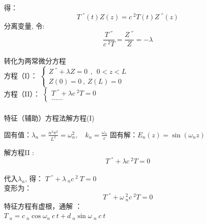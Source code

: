 \begin{frame}
      \frametitle{} 
    得：
	\begin{equation*}
		 T~^{''}(t)Z(z) =c~^2 T(t)Z~^{''}(z) 
	\end{equation*}
	分离变量, 令: {\hspace*{2em}}
      $$ \dfrac{T~^{''}}{c~^2 T}=\dfrac{Z~^{''} }{Z} =-\lambda $$ \\ \vspace{0.3cm}
    转化为两常微分方程 \\ \vspace{0.3cm}
    方程（I）：
      $\displaystyle  \begin{cases}
          Z~^{''} +\lambda Z=0  ~~,~~ 0<z<L\\
          Z(0)=0 ~,~Z(L)=0
      \end{cases}$ \\	
    方程（II）：
      $\displaystyle  \begin{cases}
          T~^{''} +\lambda {c~^2 T}=0 \\
          ......
      \end{cases}$ \\	  
\end{frame}

\begin{frame}
      \frametitle{}
    特征（辅助）方程法解方程(I)  
    \begin{enumerate}
    \IItem 固有值：$\displaystyle  \lambda_n=\frac{n^2\pi^2}{L^2}= \omega^2 _n, \quad k_n=\frac{\omega_n}{c} $ 
    \IItem 固有解：$\displaystyle  E_n(z)=\sin (\omega_n z) $
    \end{enumerate}
    解方程II : 	\[ T~^{''} +\lambda {c~^2 T}=0 \] \\ 
	代入$\lambda_n$, 得：
	$\displaystyle  T~^{''} +\lambda~_n c~^2 ~T=0 $ \\
	变形为：\[  T~^{''} +\omega ~_n ^2 {c~^2 T}=0 \]
	特征方程有虚根，通解 ：\\
	\hspace{3cm}	$\displaystyle 	T~_n=c~_n\cos \omega_n~c~t+ d~_n\sin \omega ~_n~c~t $  \\ \vspace{1em}
\end{frame}

